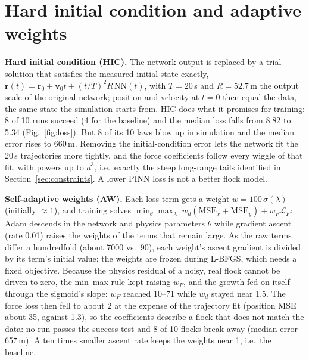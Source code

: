 \documentclass[10pt]{article}
\newcommand{\bv}[1]{\mathbf{#1}}
\begin{document}
\section{Hard initial condition and adaptive weights}
\textbf{Hard initial condition (HIC).} The network output is replaced by a trial solution that satisfies the measured initial state exactly, $\bv r(t)=\bv r_0+\bv v_0 t+(t/T)^2 R\,\mathrm{NN}(t)$, with $T=20$\,s and $R=52.7$\,m the output scale of the original network; position and velocity at $t=0$ then equal the data, the same state the simulation starts from.
HIC does what it promises for training: 8 of 10 runs succeed (4 for the baseline) and the median loss falls from 8.82 to 5.34 (Fig.~\ref{fig:loss}).
But 8 of its 10 laws blow up in simulation and the median error rises to 660\,m.
Removing the initial-condition error lets the network fit the 20\,s trajectories more tightly, and the force coefficients follow every wiggle of that fit, with powers up to $d^{3}$, i.e.\ exactly the steep long-range tails identified in Section~\ref{sec:constraints}. A lower PINN loss is not a better flock model.

\textbf{Self-adaptive weights (AW).} Each loss term gets a weight $w=100\,\sigma(\lambda)$ (initially $\approx1$), and training solves $\min_{\theta}\max_{\lambda}\; w_d(\mathrm{MSE}_x+\mathrm{MSE}_y)+w_F\mathcal L_F$: Adam descends in the network and physics parameters $\theta$ while gradient ascent (rate 0.01) raises the weights of the terms that remain large. As the raw terms differ a hundredfold (about 7000 vs.\ 90), each weight's ascent gradient is divided by its term's initial value; the weights are frozen during L-BFGS, which needs a fixed objective.
Because the physics residual of a noisy, real flock cannot be driven to zero, the min--max rule kept raising $w_F$, and the growth fed on itself through the sigmoid's slope: $w_F$ reached 10--71 while $w_d$ stayed near 1.5.
The force loss then fell to about 2 at the expense of the trajectory fit (position MSE about 35, against 1.3), so the coefficients describe a flock that does not match the data: no run passes the success test and 8 of 10 flocks break away (median error 657\,m). A ten times smaller ascent rate keeps the weights near 1, i.e.\ the baseline.

{\footnotesize
\setlength{\bibsep}{0pt}


}
\end{document}
